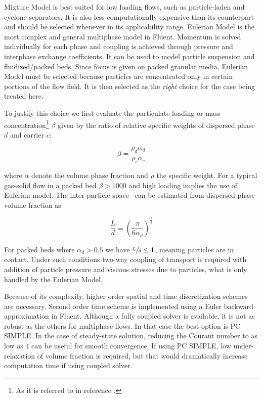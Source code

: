 Mixture Model is best suited for low loading flows, such as particle-laden and cyclone separators. It is also less computationally expensive than its counterpart and should be selected whenever in its applicability range. Eulerian Model is the most complex and general multiphase model in Fluent. Momentum is solved individually for each phase and coupling is achieved through pressure and interphase exchange coefficients. It can be used to model particle suspension and fluidized/packed beds. Since focus is given on packed granular media, Eulerian Model must be selected because particles are concentrated only in certain portions of the flow field. It is then selected as the \emph{right} choice for the case being treated here.

To justify this choice we first evaluate the particulate loading or mass concentration\footnote{As it is referred to in reference \cite{Crowe2011}.} $\beta$ given by the ratio of relative specific weights of dispersed phase $d$ and carrier $c$:

\begin{equation}
\beta=\frac{\rho_{d}\alpha_{d}}{\rho_{c}\alpha_{c}}
\end{equation}

\noindent{}where $\alpha$ denote the volume phase fraction and $\rho$ the specific weight. For a typical gas-solid flow in a packed bed $\beta>1000$ and high loading implies the use of Eulerian model. The inter-particle space~\cite{Crowe2011} can be estimated from dispersed phase volume fraction as

\begin{equation}
\frac{L}{d}=\left(\frac{\pi}{6\alpha_{d}}\right)^{\frac{1}{3}}
\end{equation}

For packed beds where $\alpha_{d}>0.5$ we have $\sfrac{L}{d}\le{}1$, meaning particles are in contact. Under such conditions two-way coupling of transport is required with addition of particle pressure and viscous stresses due to particles, what is only handled by the Eulerian Model.

Because of its complexity, higher order spatial and time discretization schemes are necessary. Second order time scheme is implemented using a Euler backward approximation in Fluent. Although a fully coupled solver is available, it is not as robust as the others for multiphase flows. In that case the best option is PC SIMPLE. In the case of steady-state solution, reducing the Courant number to as low as 4 can be useful for smooth convergence. If using PC SIMPLE, low under-relaxation of volume fraction is required, but that would dramatically increase computation time if using coupled solver.


